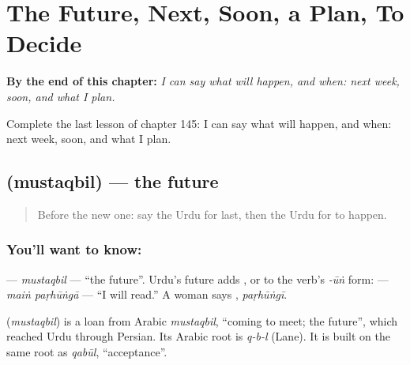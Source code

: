 
\chapter{The Future, Next, Soon, a Plan, To Decide}
\label{ch:ur-the-future-next-soon-a-plan-to-decide}

\begin{chapteropening}
\textbf{By the end of this chapter:} \emph{I can say what will happen, and when: next week, soon, and what I plan.}

Complete the last lesson of chapter 145: I can say what will happen, and when: next week, soon, and what I plan.
\end{chapteropening}

\section[\texorpdfstring{\ur{مستقبل} (mustaqbil)}{مستقبل (mustaqbil)}]{ (mustaqbil) — the future}

\label{lesson:UR-C145-mustaqbil}



\begin{quote}
Before the new one: say the Urdu for last, then the Urdu for to happen.
\end{quote}

\subsection*{You'll want to know: }
\textbf{} — \emph{mustaqbil} — \textquotedblleft{}the future\textquotedblright{}. Urdu's future adds \textbf{}, \textbf{} or \textbf{} to the verb's \emph{-ūṅ} form: \textbf{  } — \emph{maiṅ paṛhūṅgā} — \textquotedblleft{}I will read.\textquotedblright{} A woman says \textbf{ }, \emph{paṛhūṅgī}.

\begin{cousinweb}
\textbf{} (\emph{mustaqbil}) is a loan from Arabic \emph{mustaqbil}, \textquotedblleft{}coming to meet; the future\textquotedblright{}, which reached Urdu through Persian. Its Arabic root is \emph{q-b-l} (Lane). It is built on the same root as \emph{qabūl}, \textquotedblleft{}acceptance\textquotedblright{}.
\end{cousinweb}

